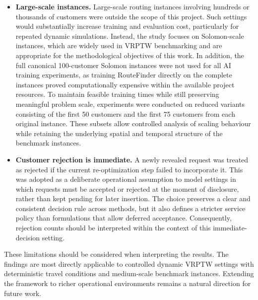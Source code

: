 \begin{itemize}
    \item \textbf{Large-scale instances.}
Large-scale routing instances involving hundreds or thousands of customers were
outside the scope of this project. Such settings would substantially increase
training and evaluation cost, particularly for repeated dynamic simulations.
Instead, the study focuses on Solomon-scale instances, which are widely used in
VRPTW benchmarking and are appropriate for the methodological objectives of this
work. In addition, the full canonical 100-customer Solomon instances were not
used for all AI training experiments, as training RouteFinder directly on the
complete instances proved computationally expensive within the available project
resources. To maintain feasible training times while still preserving meaningful
problem scale, experiments were conducted on reduced variants consisting of the
first 50 customers and the first 75 customers from each original instance. These
subsets allow controlled analysis of scaling behaviour while retaining the
underlying spatial and temporal structure of the benchmark instances.
    \item \textbf{Customer rejection is immediate.}
A newly revealed request was treated as rejected if the current re-optimization
step failed to incorporate it. This was adopted as a deliberate operational
assumption to model settings in which requests must be accepted or rejected at
the moment of disclosure, rather than kept pending for later insertion. The
choice preserves a clear and consistent decision rule across methods, but it
also defines a stricter service policy than formulations that allow deferred
acceptance. Consequently, rejection counts should be interpreted within the
context of this immediate-decision setting.

\end{itemize}

These limitations should be considered when interpreting the results. The
findings are most directly applicable to controlled dynamic VRPTW settings with
deterministic travel conditions and medium-scale benchmark instances. Extending
the framework to richer operational environments remains a natural direction for
future work.
